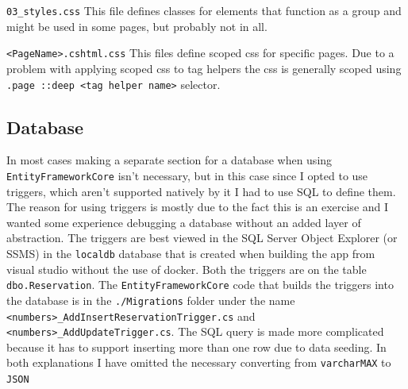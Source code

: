 \documentclass[12pt, a4paper]{article}
\begin{document}
\begin{description}
    \texttt{03\_styles.css} This file defines classes for elements that function as a group and might be used in some pages, but probably not in all.

    \texttt{<PageName>.cshtml.css} This files define scoped css for specific pages. Due to a problem with applying scoped css to tag helpers the css is generally scoped using \texttt{.page ::deep <tag helper name>} selector.

\end{description}

\subsection{Database}
In most cases making a separate section for a database when using \texttt{EntityFrameworkCore} isn't necessary, but in this case since I opted to use triggers, which aren't supported natively by it I had to use SQL to define them. The reason for using triggers is mostly due to the fact this is an exercise and I wanted some experience debugging a database without an added layer of abstraction. The triggers are best viewed in the SQL Server Object Explorer (or SSMS) in the \texttt{localdb} database that is created when building the app from visual studio without the use of docker. Both the triggers are on the table \texttt{dbo.Reservation}. The \texttt{EntityFrameworkCore} code that builds the triggers into the database is in the \texttt{./Migrations} folder under the name \texttt{<numbers>\_AddInsertReservationTrigger.cs} and \texttt{<numbers>\_AddUpdateTrigger.cs}. The SQL query is made more complicated because it has to support inserting more than one row due to data seeding. In both explanations I have omitted the necessary converting from \texttt{varchar{MAX}} to \texttt{JSON}
\end{document}
